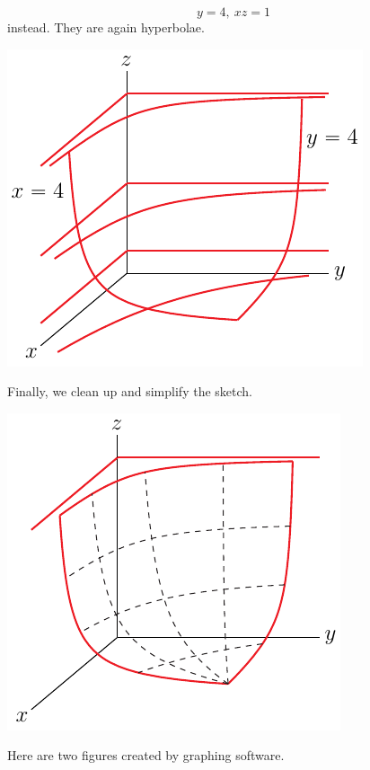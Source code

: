 \begin{eg}[$xyz=4$]
\begin{equation*}
y=4,\ xz=1
\end{equation*}
instead. They are again hyperbolae.
\begin{efig}
\begin{center}
   \includegraphics{seatC.pdf}
\end{center}
\end{efig}
Finally, we clean up and simplify the sketch.
\begin{efig}
\begin{center}
   \includegraphics{seatA.pdf}
\end{center}
\end{efig}
Here are two figures created by graphing software.
\begin{efig}
\begin{center}

\end{center}
\end{efig}
\end{eg}
